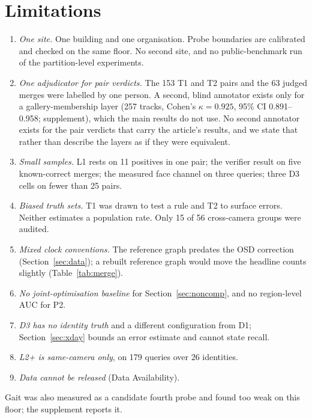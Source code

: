 \documentclass[journal]{IEEEtran}
\begin{document}
\section{Limitations}\label{sec:limits}
\begin{enumerate}
\item \emph{One site.} One building and one organisation. Probe boundaries are calibrated and checked on the same floor. No second site, and no public-benchmark run of the partition-level experiments.
\item \emph{One adjudicator for pair verdicts.} The 153 T1 and T2 pairs and the 63 judged merges were labelled by one person. A second, blind annotator exists only for a gallery-membership layer (257 tracks, Cohen's $\kappa = 0.925$, 95\% CI 0.891--0.958; supplement), which the main results do not use. No second annotator exists for the pair verdicts that carry the article's results, and we state that rather than describe the layers as if they were equivalent.
\item \emph{Small samples.} L1 rests on 11 positives in one pair; the verifier result on five known-correct merges; the measured face channel on three queries; three D3 cells on fewer than 25 pairs.
\item \emph{Biased truth sets.} T1 was drawn to test a rule and T2 to surface errors. Neither estimates a population rate. Only 15 of 56 cross-camera groups were audited.
\item \emph{Mixed clock conventions.} The reference graph predates the OSD correction (Section~\ref{sec:data}); a rebuilt reference graph would move the headline counts slightly (Table~\ref{tab:merge}).
\item \emph{No joint-optimisation baseline} for Section~\ref{sec:noncomp}, and no region-level AUC for P2.
\item \emph{D3 has no identity truth} and a different configuration from D1; Section~\ref{sec:xday} bounds an error estimate and cannot state recall.
\item \emph{L2+ is same-camera only}, on 179 queries over 26 identities.
\item \emph{Data cannot be released} (Data Availability).
\end{enumerate}
Gait was also measured as a candidate fourth probe and found too weak on this floor; the supplement reports it.
\end{document}
